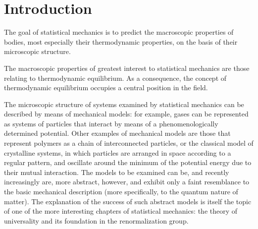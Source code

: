 \documentclass[11pt, a4paper, twoside, openright]{book}
\begin{document}

\frontmatter


\tableofcontents


\pagestyle{plain}

\chapter{Introduction}

The goal of statistical mechanics \cite{introduction} is to predict the macroscopic properties of bodies, most especially their thermodynamic properties, on the basis of their microscopic structure.

The macroscopic properties of greatest interest to statistical mechanics are those relating to thermodynamic equilibrium. As a consequence, the concept of thermodynamic equilibrium occupies a central position in the field. 

The microscopic structure of systems examined by statistical mechanics can be described by means of mechanical models: for example, gases can be represented as systems of particles that interact by means of a phenomenologically determined potential. Other examples of mechanical models are those that represent polymers as a chain of interconnected particles, or the classical model of crystalline systems, in which particles are arranged in space according to a regular pattern, and oscillate around the minimum of the potential energy due to their mutual interaction. The models to be examined can be, and recently increasingly are, more abstract, however, and exhibit only a faint resemblance to the basic mechanical description (more specifically, to the quantum nature of matter). The explanation of the success of such abstract models is itself the topic of one of the more interesting chapters of statistical mechanics: the theory of universality and its foundation in the renormalization group.
\end{document}

